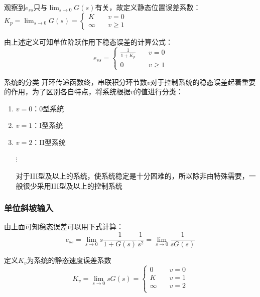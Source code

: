 观察到$e_{ss}$只与$\lim_{s\rightarrow 0} G(s)$有关，故定义静态位置误差系数：
$K_p = \lim_{s\to 0} G(s) = \begin{cases}
K&\quad v=0 \\
\infty &\quad v\geq 1
\end{cases}$


由上述定义可知单位阶跃作用下稳态误差的计算公式：
\begin{equation*}
    e_{ss} = \begin{cases}
        \frac{1}{1+K_p} &\quad v=0\\
        0 & \quad v\geq 1
    \end{cases}
\end{equation*}

\begin{definition}{系统的分类}
    开环传递函数终，串联积分环节数$v$对于控制系统的稳态误差起着重要的作用，为了区别各自特点，将系统根据$v$的值进行分类：
    \begin{enumerate}
        \item $v=0$：0型系统
        \item $v=1$：I型系统
        \item $v=2$：II型系统
        
        $\vdots$

        对于III型及以上的系统，使系统稳定是十分困难的，所以除非由特殊需要，一般很少采用III型及以上的控制系统
    \end{enumerate}
\end{definition}

\subsubsection{单位斜坡输入}

由上面可知稳态误差可以用下式计算：
\begin{equation*}
    e_{ss} = \lim_{s\to 0}s\frac{1}{1+G(s)} \frac{1}{s^2} = \lim_{s\to 0}\frac{1}{sG(s)}
\end{equation*}

定义$K_v$为系统的静态速度误差系数
\begin{equation*}
    K_v = \lim_{s\to 0} sG(s) = \begin{cases}
        0 & \quad v=0\\
        K & \quad v=1\\
        \infty & \quad v=2\\
    \end{cases}
\end{equation*}

